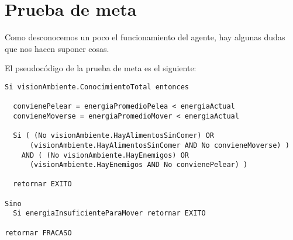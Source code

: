 \section{Prueba de meta}

Como desconocemos un poco el funcionamiento del agente, hay algunas dudas que
nos hacen suponer cosas.

El pseudocódigo de la prueba de meta es el siguiente:

\begin{verbatim}
Si visionAmbiente.ConocimientoTotal entonces

  convienePelear = energiaPromedioPelea < energiaActual
  convieneMoverse = energiaPromedioMover < energiaActual

  Si ( (No visionAmbiente.HayAlimentosSinComer) OR
      (visionAmbiente.HayAlimentosSinComer AND No convieneMoverse) )
    AND ( (No visionAmbiente.HayEnemigos) OR
      (visionAmbiente.HayEnemigos AND No convienePelear) )

  retornar EXITO

Sino
  Si energiaInsuficienteParaMover retornar EXITO

retornar FRACASO
\end{verbatim}

